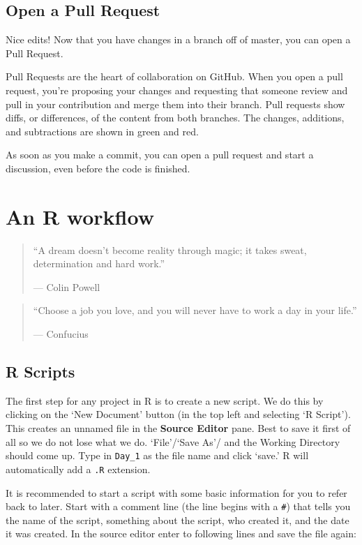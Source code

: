 \documentclass[
]{book}
\begin{document}
\hypertarget{open-a-pull-request}{%
\section{Open a Pull Request}\label{open-a-pull-request}}

Nice edits! Now that you have changes in a branch off of master, you can open a Pull Request.

Pull Requests are the heart of collaboration on GitHub. When you open a pull request, you're proposing your changes and requesting that someone review and pull in your contribution and merge them into their branch. Pull requests show diffs, or differences, of the content from both branches. The changes, additions, and subtractions are shown in green and red.

As soon as you make a commit, you can open a pull request and start a discussion, even before the code is finished.

\hypertarget{workflow}{%
\chapter{An R workflow}\label{workflow}}

\begin{quote}
``A dream doesn't become reality through magic; it takes sweat, determination and hard work.''

--- Colin Powell
\end{quote}

\begin{quote}
``Choose a job you love, and you will never have to work a day in your life.''

--- Confucius
\end{quote}

\hypertarget{r-scripts}{%
\section{R Scripts}\label{r-scripts}}

The first step for any project in R is to create a new script. We do this by clicking on the `New Document' button (in the top left and selecting `R Script'). This creates an unnamed file in the \textbf{Source Editor} pane. Best to save it first of all so we do not lose what we do. `File'/`Save As'/ and the Working Directory should come up. Type in \texttt{Day\_1} as the file name and click `save.' R will automatically add a \texttt{.R} extension.

It is recommended to start a script with some basic information for you to refer back to later. Start with a comment line (the line begins with a \texttt{\#}) that tells you the name of the script, something about the script, who created it, and the date it was created. In the source editor enter to following lines and save the file again:
\end{document}
